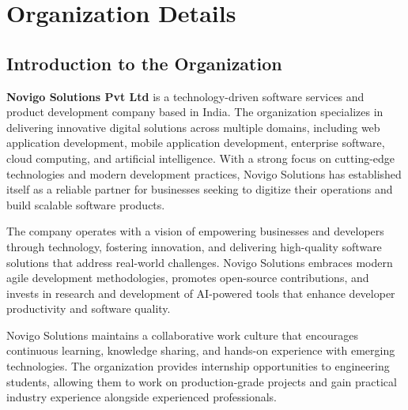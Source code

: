 \documentclass[12pt,a4paper,openany]{report}
\begin{document}
\renewcommand{\contentsname}{Table of Contents}
\tableofcontents
{}
\newpage

\listoftables
{}
\newpage

\pagestyle{fancy}
\fancyhf{}
\renewcommand{\headrulewidth}{0.5pt}
\renewcommand{\footrulewidth}{0.5pt}


\chapter{Organization Details}

\section{Introduction to the Organization}

\textbf{Novigo Solutions Pvt Ltd} is a technology-driven software services and product development company based in India. The organization specializes in delivering innovative digital solutions across multiple domains, including web application development, mobile application development, enterprise software, cloud computing, and artificial intelligence. With a strong focus on cutting-edge technologies and modern development practices, Novigo Solutions has established itself as a reliable partner for businesses seeking to digitize their operations and build scalable software products.

The company operates with a vision of empowering businesses and developers through technology, fostering innovation, and delivering high-quality software solutions that address real-world challenges. Novigo Solutions embraces modern agile development methodologies, promotes open-source contributions, and invests in research and development of AI-powered tools that enhance developer productivity and software quality.

Novigo Solutions maintains a collaborative work culture that encourages continuous learning, knowledge sharing, and hands-on experience with emerging technologies. The organization provides internship opportunities to engineering students, allowing them to work on production-grade projects and gain practical industry experience alongside experienced professionals.
\end{document}
